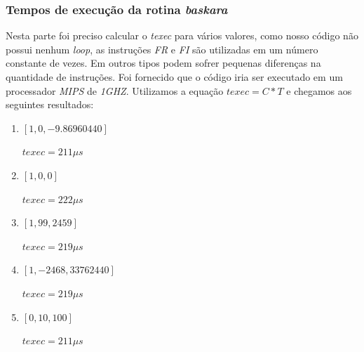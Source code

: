 \documentclass[12pt]{article}
\begin{document}
\subsubsection{Tempos de execução da rotina \textit{baskara}}
\label{subsubsec:4.4}

Nesta parte foi preciso calcular o \textit{texec} para vários valores, como nosso código não possui nenhum \textit{loop}, as instruções \textit{FR} e \textit{FI} são utilizadas em um número constante de vezes. Em outros tipos podem sofrer pequenas diferenças na quantidade de instruções. Foi fornecido que o código iria ser executado em um processador \textit{MIPS} de \textit{1GHZ}. Utilizamos a equação \(texec= C * T\) e chegamos aos seguintes resultados:

\begin{enumerate}[label={\alph*)}]
\item \([1, 0, -9.86960440]\)

	\(texec = 211 \mu s\)
\item \([1, 0, 0]\)

	\(texec = 222 \mu s\)
\item \([1, 99, 2459]\)

	\(texec = 219 \mu s\)

\item \([1, -2468, 33762440]\)

	\(texec = 219 \mu s\)
\item \([0, 10, 100]\)

	\(texec = 211 \mu s\)
\end{enumerate}



\end{document}
